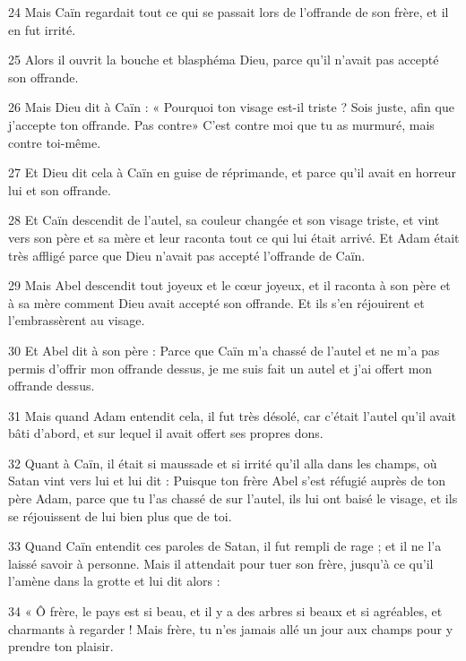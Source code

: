 \par 24 Mais Caïn regardait tout ce qui se passait lors de l'offrande de son frère, et il en fut irrité.

\par 25 Alors il ouvrit la bouche et blasphéma Dieu, parce qu'il n'avait pas accepté son offrande.

\par 26 Mais Dieu dit à Caïn : « Pourquoi ton visage est-il triste ? Sois juste, afin que j'accepte ton offrande. Pas contre» C'est contre moi que tu as murmuré, mais contre toi-même.

\par 27 Et Dieu dit cela à Caïn en guise de réprimande, et parce qu'il avait en horreur lui et son offrande.

\par 28 Et Caïn descendit de l'autel, sa couleur changée et son visage triste, et vint vers son père et sa mère et leur raconta tout ce qui lui était arrivé. Et Adam était très affligé parce que Dieu n'avait pas accepté l'offrande de Caïn.

\par 29 Mais Abel descendit tout joyeux et le cœur joyeux, et il raconta à son père et à sa mère comment Dieu avait accepté son offrande. Et ils s'en réjouirent et l'embrassèrent au visage.

\par 30 Et Abel dit à son père : Parce que Caïn m'a chassé de l'autel et ne m'a pas permis d'offrir mon offrande dessus, je me suis fait un autel et j'ai offert mon offrande dessus.

\par 31 Mais quand Adam entendit cela, il fut très désolé, car c'était l'autel qu'il avait bâti d'abord, et sur lequel il avait offert ses propres dons.

\par 32 Quant à Caïn, il était si maussade et si irrité qu'il alla dans les champs, où Satan vint vers lui et lui dit : Puisque ton frère Abel s'est réfugié auprès de ton père Adam, parce que tu l'as chassé de sur l'autel, ils lui ont baisé le visage, et ils se réjouissent de lui bien plus que de toi.

\par 33 Quand Caïn entendit ces paroles de Satan, il fut rempli de rage ; et il ne l'a laissé savoir à personne. Mais il attendait pour tuer son frère, jusqu'à ce qu'il l'amène dans la grotte et lui dit alors :

\par 34 « Ô frère, le pays est si beau, et il y a des arbres si beaux et si agréables, et charmants à regarder ! Mais frère, tu n'es jamais allé un jour aux champs pour y prendre ton plaisir.

